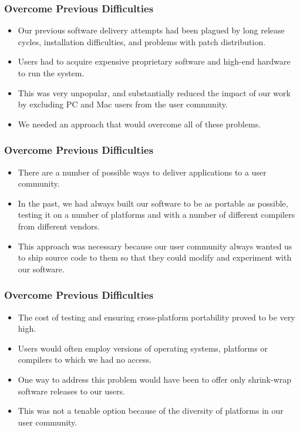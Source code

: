 \documentclass{beamer}
\begin{document}
\begin{frame}
\frametitle{Overcome Previous Difficulties}

\begin{itemize}
\item Our previous software delivery attempts had been plagued by long release cycles, installation difficulties, and problems with patch distribution.
\item Users had to acquire expensive proprietary software and high-end hardware to run the system.
\item This was very unpopular, and substantially reduced the impact of our work by excluding PC and Mac users from the user community.
\item We needed an approach that would overcome all of these problems.
\end{itemize}

\end{frame}

\begin{frame}
\frametitle{Overcome Previous Difficulties}

\begin{itemize}
\item There are a number of possible ways to deliver applications to a user community.
\item In the past, we had always built our software to be as portable as possible, testing it on a number of platforms and with a number of different compilers from different vendors.
\item This approach was necessary because our user community always wanted us to ship source code to them so that they could modify and experiment with our software.
\end{itemize}

\end{frame}

\begin{frame}
\frametitle{Overcome Previous Difficulties}

\begin{itemize}
\item The cost of testing and ensuring cross-platform portability proved to be very high.
\item Users would often employ versions of operating systems, platforms or compilers to which we had no access.
\item One way to address this problem would have been to offer only shrink-wrap software releases to our users.
\item This was not a tenable option because of the diversity of platforms in our user community.
\end{itemize}

\end{frame}
\end{document}
